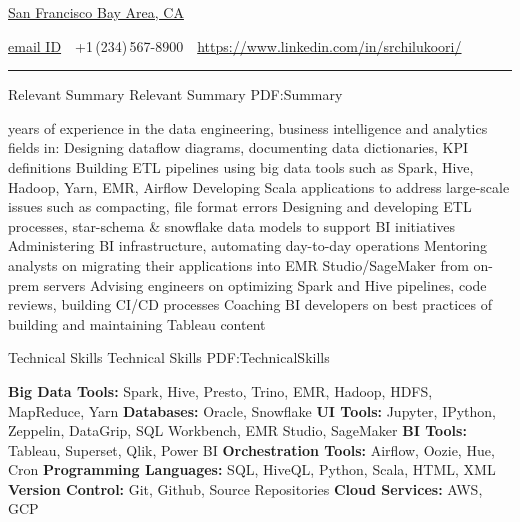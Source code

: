 \documentclass[letterpaper,MMMyyyy,nonstopmode]{simpleresumecv}
\newcommand{\CVAuthor}{Sadha Chilukoori}
\newcommand{\CVWebpage}{https://www.linkedin.com/in/srchilukoori/}
\begin{document}

\Title{\CVAuthor}

\begin{SubTitle}
\href{https://www.google.com/maps/place/San+Francisco+Bay+Area,+CA/}
{San Francisco Bay Area, CA}
\par
\href{mailto:<email ID>}
{email ID}
\,\SubBulletSymbol\,
+1\,(234)\,567-8900
\,\SubBulletSymbol\,
\href{\CVWebpage}
{\url{\CVWebpage}}
\end{SubTitle}

\Gap
\hrule
\BigGap

\begin{Body}

\Section
{Relevant Summary}
{Relevant Summary}
{PDF:Summary}

\begingroup

 years of experience in the data engineering, business intelligence and analytics fields in:
\SummaryHighlightItem Designing dataflow diagrams, documenting data dictionaries, KPI definitions
\SummaryHighlightItem Building ETL pipelines using big data tools such as Spark, Hive, Hadoop, Yarn, EMR, Airflow
\SummaryHighlightItem Developing Scala applications to address large-scale issues such as compacting, file format errors
\SummaryHighlightItem Designing and developing ETL processes, star-schema \& snowflake data models to support BI initiatives
\SummaryHighlightItem Administering BI infrastructure, automating day-to-day operations
\SummaryHighlightItem Mentoring analysts on migrating their applications into EMR Studio/SageMaker from on-prem servers
\SummaryHighlightItem Advising engineers on optimizing Spark and Hive pipelines, code reviews, building CI/CD processes
\SummaryHighlightItem Coaching BI developers on best practices of building and maintaining Tableau content

\endgroup

\Section
{Technical Skills}
{Technical Skills}
{PDF:TechnicalSkills}

\begingroup

\Entry \textbf{Big Data Tools:} Spark, Hive, Presto, Trino, EMR, Hadoop, HDFS, MapReduce, Yarn
\Entry \textbf{Databases:} Oracle, Snowflake
\Entry \textbf{UI Tools:} Jupyter, IPython, Zeppelin, DataGrip, SQL Workbench, EMR Studio, SageMaker
\Entry \textbf{BI Tools:} Tableau, Superset, Qlik, Power BI
\Entry \textbf{Orchestration Tools:} Airflow, Oozie, Hue, Cron
\Entry \textbf{Programming Languages:} SQL, HiveQL, Python, Scala, HTML, XML
\Entry \textbf{Version Control:} Git, Github, Source Repositories
\Entry \textbf{Cloud Services:} AWS, GCP


\end{Body}
\end{document}
